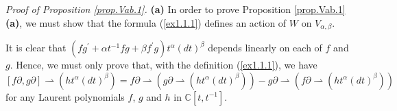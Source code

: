 \documentclass[etingof-lie.tex]{subfiles}
\begin{document}
\textit{Proof of Proposition \ref{prop.Vab.1}.} \textbf{(a)} In order to prove
Proposition \ref{prop.Vab.1} \textbf{(a)}, we must show that the formula
(\ref{ex1.1.1}) defines an action of $W$ on $V_{\alpha,\beta}$.

It is clear that $\left(  fg^{\prime}+\alpha t^{-1}fg+\beta f^{\prime
}g\right)  t^{\alpha}\left(  dt\right)  ^{\beta}$ depends linearly on each of
$f$ and $g$. Hence, we must only prove that, with the definition
(\ref{ex1.1.1}), we have
\begin{equation}
\left[  f\partial,g\partial\right]  \rightharpoonup\left(  ht^{\alpha}\left(
dt\right)  ^{\beta}\right)  =f\partial\rightharpoonup\left(  g\partial
\rightharpoonup\left(  ht^{\alpha}\left(  dt\right)  ^{\beta}\right)  \right)
-g\partial\rightharpoonup\left(  f\partial\rightharpoonup\left(  ht^{\alpha
}\left(  dt\right)  ^{\beta}\right)  \right)  \label{sol1.1.1}%
\end{equation}
for any Laurent polynomials $f$, $g$ and $h$ in $\mathbb{C}\left[
t,t^{-1}\right]  $.
\end{document}
